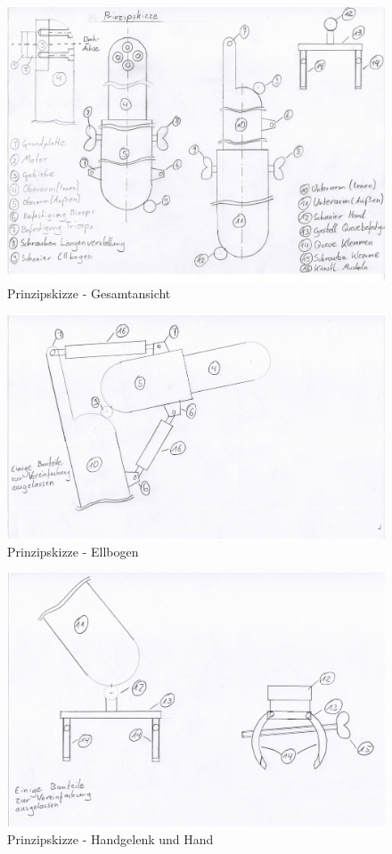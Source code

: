 	\begin{figure}[h]
		\centering
		\includegraphics[width=\textwidth]{"Abb/Prinzipskizze Gesamtansicht"}
		\caption[Prinzipskizze - Gesamtansicht]{Prinzipskizze - Gesamtansicht}
		\label{fig:prinzipskizze-gesamtansicht}
	\end{figure}

	\begin{figure}[h]
		\centering
		\includegraphics[width=\textwidth]{"Abb/Prinzipskizze Ellbogen"}
		\caption[Prinzipskizze - Ellbogen]{Prinzipskizze - Ellbogen}
		\label{fig:prinzipskizze-ellbogen}
	\end{figure}

	\begin{figure}[h]
		\centering
		\includegraphics[width=\textwidth]{"Abb/Prinzipskizze Handgelenk und Hand"}
		\caption[Prinzipskizze - Handgelenk und Hand]{Prinzipskizze - Handgelenk und Hand}
		\label{fig:prinzipskizze-handgelenk-und-hand}
	\end{figure}